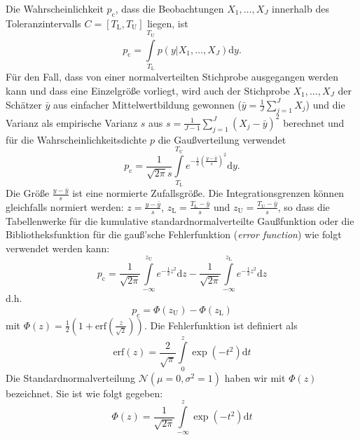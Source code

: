 Die Wahrscheinlichkeit $p_\mathrm{c}$, dass die Beobachtungen ${X_1,\dots,X_J}$ innerhalb des Toleranzintervalls
$C = [T_\mathrm{L}, T_\mathrm{U}]$ liegen, ist
\begin{equation}
	p_\mathrm{c} =  \int\limits_{T_\mathrm{L}}^{T_\mathrm{U}} p(y|{X_1,\dots,X_J}) \mathrm{d}y.
\end{equation}
Für den Fall, dass von einer normalverteilten Stichprobe ausgegangen werden kann und dass eine Einzelgröße
vorliegt, wird auch der Stichprobe ${X_1,\dots,X_J}$ der Schätzer $\bar y$ aus einfacher Mittelwertbildung
gewonnen ($\bar y = \frac{1}{J} \sum\limits_{j=1}^J X_j$) und die Varianz als empirische Varianz $s$ aus
$s = \frac{1}{J-1}\sum\limits_{j=1}^J (X_j - \bar y)^2$ berechnet
und für die Wahrscheinlichkeitsdichte $p$ die Gaußverteilung verwendet
\begin{equation}
	p_\mathrm{c} = \frac{1}{\sqrt{2 \pi} s} \int\limits_{T_\mathrm{L}}^{T_\mathrm{U}}
	e^{-\frac{1}{2}\left(\frac{y - \bar y}{s}\right)^2} \mathrm{d}y .
		\label{eq:Konformitaetswahrscheinlichkeit}
\end{equation}
Die Größe $\frac{y - \bar y}{s}$ ist eine normierte Zufallsgröße. Die Integrationsgrenzen können gleichfalls
normiert werden: $z = \frac{y - \bar y}{s}$, $z_\mathrm{L} = \frac{T_\mathrm{L} - \bar y}{s}$ und
$z_\mathrm{U} = \frac{T_\mathrm{U} - \bar y}{s}$, so dass die Tabellenwerke für die kumulative
standardnormalverteilte Gaußfunktion oder die Bibliotheksfunktion
für die gauß'sche Fehlerfunktion (\textsl{error function}) wie folgt verwendet werden kann:
\begin{equation}
	p_\mathrm{c} = \frac{1}{\sqrt{2 \pi}} \int\limits_{-\infty}^{z_\mathrm{U}}
	e^{-\frac{1}{2} z^2} \mathrm{d}z -
	\frac{1}{\sqrt{2 \pi}} \int\limits_{-\infty}^{z_\mathrm{L}} e^{-\frac{1}{2} z^2} \mathrm{d}z
\end{equation}
d.h.
\begin{equation}
	p_\mathrm{c} = \Phi(z_\mathrm{U}) - \Phi(z_\mathrm{L})
\end{equation}
mit $\Phi(z) = \frac{1}{2} \left(1 + \mathrm{erf}\left(\frac{z}{\sqrt{2}}\right) \right)$. Die Fehlerfunktion ist definiert als
\begin{equation}
	\mathrm{erf}(z)= \frac{2}{\sqrt{\pi}}\int\limits_{0}^{z} \exp (-t^2)\mathrm{d}t
\end{equation}
Die Standardnormalverteilung $\mathcal{N}(\mu=0,\sigma^2=1)$ haben wir mit $\Phi(z)$ bezeichnet. Sie ist wie folgt gegeben:
\begin{equation}
	\Phi(z)= \frac{1}{\sqrt{2\pi}}\int\limits_{-\infty}^{z} \exp (-t^2)\mathrm{d}t
\end{equation}
